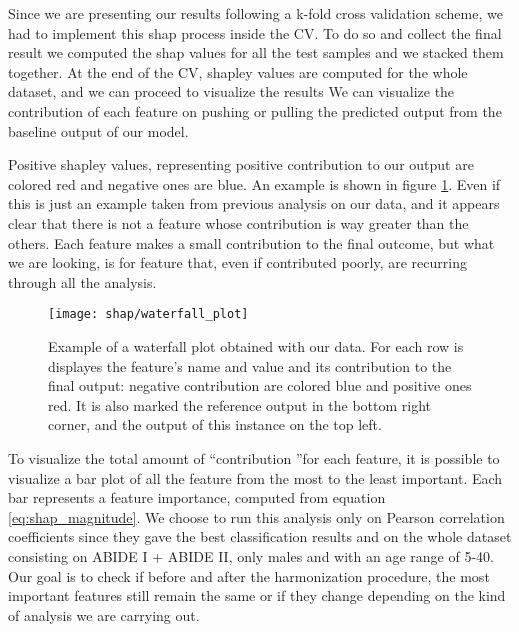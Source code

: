 \documentclass[11pt]{report}
\begin{document}
Since we are presenting our results following a k-fold cross validation scheme, we had to implement this shap process inside the CV.
To do so and collect the final result we computed the shap values for all the test samples and we stacked them together.
At the end of the CV, shapley values are computed for the whole dataset, and we can proceed to visualize the results
We can visualize the contribution of each feature on pushing or pulling the predicted output from the baseline output of our model.

Positive shapley values, representing positive contribution to our output are colored red and negative ones are blue.
An example is shown in figure \ref{fig:shap_waterfall}.
Even if this is just an example taken from previous analysis on our data, and it appears clear that there is not a feature whose contribution is way greater than the others.
Each feature makes a small contribution to the final outcome, but what we are looking, is for feature that, even if contributed poorly, are recurring through all the analysis.





\begin{figure}[h]
\centering
\texttt{[image: shap/waterfall\_plot]}
\caption{Example of a waterfall plot obtained with our data. For each row is displayes the feature's name and value and its contribution to the final output: negative contribution are colored blue and positive ones red. It is also marked the reference output in the bottom right corner, and the output of this instance on the top left.
}\label{fig:shap_waterfall}
\end{figure}


To visualize the total amount of \textquotedblleft contribution \textquotedblright for each feature, it is  possible to visualize a bar plot of all the feature from the most to the least important.
Each bar represents a feature importance, computed from equation \ref{eq:shap_magnitude}.
We choose to run this analysis only on Pearson correlation coefficients since they gave the best classification results and on the whole dataset consisting on ABIDE I + ABIDE II, only males and with an age range of 5-40.
Our goal is to check if before and after the harmonization procedure, the most important features still remain the same or if they change depending on the kind of analysis we are carrying out.
\end{document}
